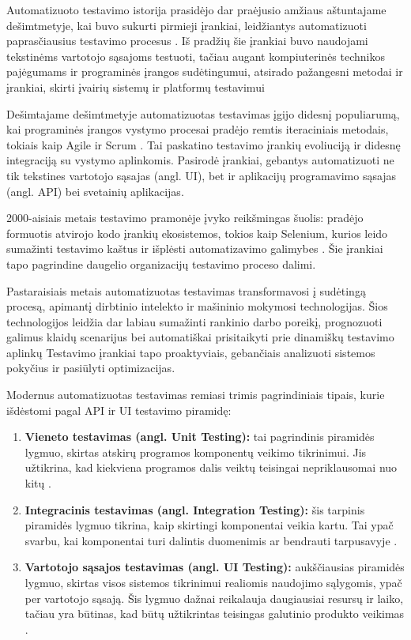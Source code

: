 \documentclass[
]{VUMIFPSkursinis}
\begin{document}
Automatizuoto testavimo istorija prasidėjo dar praėjusio amžiaus aštuntajame dešimtmetyje, kai buvo sukurti pirmieji įrankiai, leidžiantys automatizuoti paprasčiausius testavimo procesus \cite{fowler2018}. Iš pradžių šie įrankiai buvo naudojami tekstinėms vartotojo sąsajoms testuoti, tačiau augant kompiuterinės technikos pajėgumams ir programinės įrangos sudėtingumui, atsirado pažangesni metodai ir įrankiai, skirti įvairių sistemų ir platformų testavimui \cite{koranne2010}

Dešimtajame dešimtmetyje automatizuotas testavimas įgijo didesnį populiarumą, kai programinės įrangos vystymo procesai pradėjo remtis iteraciniais metodais, tokiais kaip Agile ir Scrum \cite{cohn2009}. Tai paskatino testavimo įrankių evoliuciją ir didesnę integraciją su vystymo aplinkomis. Pasirodė įrankiai, gebantys automatizuoti ne tik tekstines vartotojo sąsajas (angl. UI), bet ir aplikacijų programavimo sąsajas (angl. API) bei svetainių aplikacijas.

2000-aisiais metais testavimo pramonėje įvyko reikšmingas šuolis: pradėjo formuotis atvirojo kodo įrankių ekosistemos, tokios kaip Selenium, kurios leido sumažinti testavimo kaštus ir išplėsti automatizavimo galimybes \cite{Selenium2023}. Šie įrankiai tapo pagrindine daugelio organizacijų testavimo proceso dalimi.

Pastaraisiais metais automatizuotas testavimas transformavosi į sudėtingą procesą, apimantį dirbtinio intelekto ir mašininio mokymosi technologijas. Šios technologijos leidžia dar labiau sumažinti rankinio darbo poreikį, prognozuoti galimus klaidų scenarijus bei automatiškai prisitaikyti prie dinamiškų testavimo aplinkų \cite{Testim} Testavimo įrankiai tapo proaktyviais, gebančiais analizuoti sistemos pokyčius ir pasiūlyti optimizacijas.

Modernus automatizuotas testavimas remiasi trimis pagrindiniais tipais, kurie išdėstomi pagal API ir UI testavimo piramidę:
\begin{enumerate}
    \item \textbf{Vieneto testavimas (angl. Unit Testing):} tai pagrindinis piramidės lygmuo, skirtas atskirų programos komponentų veikimo tikrinimui. Jis užtikrina, kad kiekviena programos dalis veiktų teisingai nepriklausomai nuo kitų \cite{meszaros2007}.
    \item \textbf{Integracinis testavimas (angl. Integration Testing):} šis tarpinis piramidės lygmuo tikrina, kaip skirtingi komponentai veikia kartu. Tai ypač svarbu, kai komponentai turi dalintis duomenimis ar bendrauti tarpusavyje \cite{fowler2018}.
    \item \textbf{Vartotojo sąsajos testavimas (angl. UI Testing):} aukščiausias piramidės lygmuo, skirtas visos sistemos tikrinimui realiomis naudojimo sąlygomis, ypač per vartotojo sąsają. Šis lygmuo dažnai reikalauja daugiausiai resursų ir laiko, tačiau yra būtinas, kad būtų užtikrintas teisingas galutinio produkto veikimas \cite{meszaros2007}.
\end{enumerate}
\end{document}

